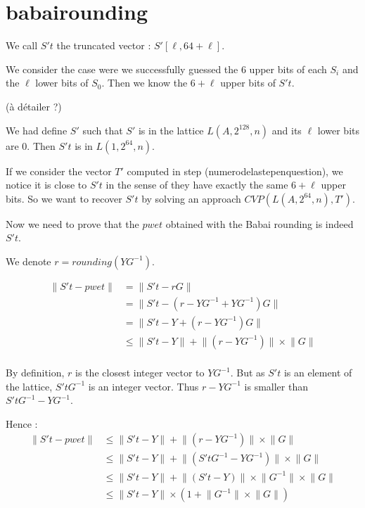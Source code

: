 \documentclass[preprint]{iacrtrans}
\begin{document}
{\begin{enumerate}
\end{enumerate}


\section{babairounding}

We call \(S't\) the truncated vector : \(S'[\ell,64+\ell]\).

We consider the case were we successfully guessed the 6 upper bits of each \(S_i\) and the \(\ell\) lower bits of \(S_0\). Then we know the \(6+\ell\) upper bits of \(S't\).

(à détailer ?)	

We had define \(S'\) such that \(S'\) is in the lattice \(L(A,2^{128},n)\) and its \(\ell \) lower bits are 0. Then \(S't\) is in \(L(1,2^{64},n)\).

If we consider the vector \(T'\) computed in step (numerodelastepenquestion), we notice it is close to \(S't\) in the sense of they have exactly the same \(6+\ell\) upper bits. So we want to recover \(S't\) by solving an approach \(CVP(L(A,2^{64},n),T')\).

Now we need to prove that the \(pwet\) obtained with the Babai rounding is indeed \(S't\).

We denote \(r = rounding(YG^{-1}) \).

\begin{align*}
\lVert S't - pwet \rVert &= \lVert S't - rG \rVert \\
&= \lVert S't - (r-YG^{-1} + YG^{-1})G \rVert\\
&= \lVert S't - Y + (r-YG^{-1})G \rVert\\
&\leqslant \lVert S't - Y \rVert + \lVert(r-YG^{-1})\rVert \times \lVert G\rVert\\	
\end{align*}

By definition, \(r\) is the closest integer vector to \(YG^{-1}\). But as \(S't\) is an element of the lattice, \(S'tG^{-1}\) is an integer vector. Thus \(r-YG^{-1}\) is smaller than \(S'tG^{-1}-YG^{-1}\).

Hence :
\begin{align*}
\lVert S't - pwet \rVert &\leqslant \lVert S't - Y \rVert + \lVert(r-YG^{-1})\rVert \times \lVert G\rVert\\	
&\leqslant \lVert S't - Y \rVert + \lVert(S'tG^{-1}-YG^{-1})\rVert \times \lVert G\rVert\\	
&\leqslant \lVert S't - Y \rVert + \lVert(S't-Y)\rVert \times \lVert G^{-1} \rVert  \times \lVert G\rVert\\
& 	\leqslant \lVert S't - Y \rVert \times (1 +\lVert G^{-1} \rVert  \times \lVert G\rVert )\\
\end{align*}

}
\end{document}
